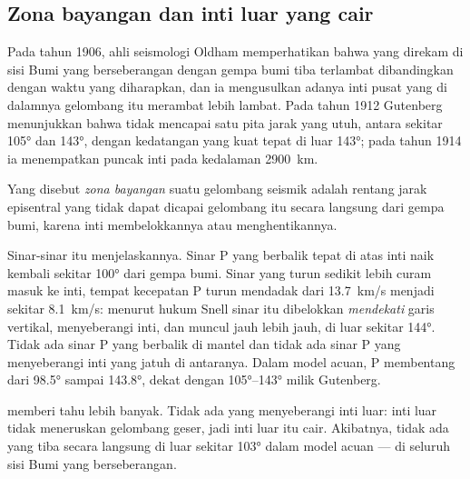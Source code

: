 \subsection{Zona bayangan dan inti luar yang cair}

Pada tahun 1906, ahli seismologi Oldham memperhatikan bahwa  yang
direkam di sisi Bumi yang berseberangan dengan gempa bumi tiba terlambat
dibandingkan dengan waktu yang diharapkan, dan ia mengusulkan adanya inti
pusat yang di dalamnya gelombang itu merambat lebih lambat. Pada tahun 1912
Gutenberg menunjukkan bahwa  tidak mencapai satu pita jarak yang
utuh, antara sekitar \ang{105} dan \ang{143}, dengan kedatangan yang kuat tepat
di luar \ang{143}; pada tahun 1914 ia menempatkan puncak inti pada kedalaman
\qty{2900}{km}.

\begin{definition}\label{def:g11:seismic-structure:shadow-zone}
Yang disebut \emph{zona bayangan} suatu gelombang seismik
adalah rentang jarak episentral yang tidak dapat dicapai gelombang itu secara
langsung dari gempa bumi, karena inti membelokkannya atau menghentikannya.
\end{definition}

Sinar-sinar itu menjelaskannya. Sinar P yang berbalik tepat di atas inti naik
kembali sekitar \ang{100} dari gempa bumi. Sinar yang turun sedikit lebih curam
masuk ke inti, tempat kecepatan P turun mendadak dari \qty{13.7}{km/s} menjadi
sekitar \qty{8.1}{km/s}: menurut hukum Snell sinar itu dibelokkan \emph{mendekati}
garis vertikal, menyeberangi inti, dan muncul jauh lebih jauh, di luar sekitar
\ang{144}. Tidak ada sinar P yang berbalik di mantel dan tidak ada sinar P yang
menyeberangi inti yang jatuh di antaranya. Dalam model acuan,  P
membentang dari \ang{98.5} sampai \ang{143.8}, dekat dengan \ang{105}--\ang{143}
milik Gutenberg.

 memberi tahu lebih banyak. Tidak ada  yang menyeberangi
inti luar: inti luar tidak meneruskan gelombang geser, jadi inti luar itu cair.
Akibatnya, tidak ada  yang tiba secara langsung di luar sekitar
\ang{103} dalam model acuan --- di seluruh sisi Bumi yang berseberangan.

